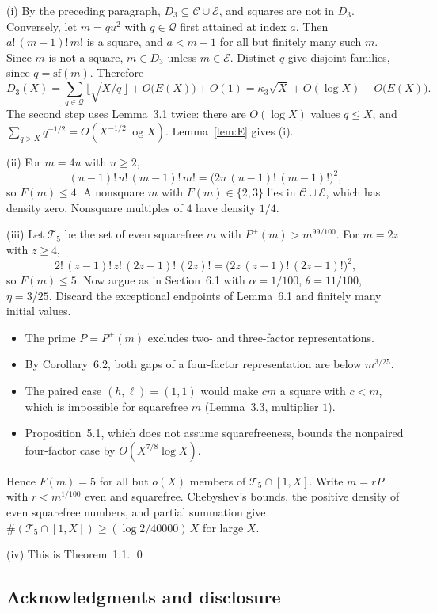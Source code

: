 \documentclass[letterpaper]{article}
\theoremstyle{definition}
\theoremstyle{remark}
\numberwithin{equation}{section}
\begin{document}
(i) By the preceding paragraph, $D_3\subseteq\mathcal C\cup\mathcal E$, and squares are not in $D_3$.
Conversely, let $m=qu^2$ with $q\in\mathcal Q$ first attained at index $a$. Then $a!\,(m-1)!\,m!$ is a
square, and $a<m-1$ for all but finitely many such $m$. Since $m$ is not a square, $m\in D_3$ unless
$m\in\mathcal E$. Distinct $q$ give disjoint families, since $q=\mathrm{sf}(m)$. Therefore
\[
  D_3(X)=\sum_{q\in\mathcal Q}\bigl\lfloor\sqrt{X/q}\,\bigr\rfloor+O\bigl(E(X)\bigr)+O(1)
  =\kappa_3\sqrt X+O(\log X)+O\bigl(E(X)\bigr).
\]
The second step uses Lemma~3.1 twice: there are $O(\log X)$ values $q\le X$, and
$\sum_{q>X}q^{-1/2}=O(X^{-1/2}\log X)$. Lemma~\ref{lem:E} gives (i).

(ii) For $m=4u$ with $u\ge 2$,
\[ (u-1)!\,u!\,(m-1)!\,m!=\bigl(2u\,(u-1)!\,(m-1)!\bigr)^2, \]
so $F(m)\le 4$. A nonsquare $m$ with $F(m)\in\{2,3\}$ lies in $\mathcal C\cup\mathcal E$, which has
density zero. Nonsquare multiples of $4$ have density $1/4$.

(iii) Let $\mathcal T_5$ be the set of even squarefree $m$ with $P^+(m)>m^{99/100}$. For $m=2z$ with
$z\ge 4$,
\[ 2!\,(z-1)!\,z!\,(2z-1)!\,(2z)!=\bigl(2z\,(z-1)!\,(2z-1)!\bigr)^2, \]
so $F(m)\le 5$. Now argue as in Section~6.1 with $\alpha=1/100$, $\theta=11/100$, $\eta=3/25$.
Discard the exceptional endpoints of Lemma~6.1 and finitely many initial values.
\begin{itemize}
\item The prime $P=P^+(m)$ excludes two- and three-factor representations.
\item By Corollary~6.2, both gaps of a four-factor representation are below $m^{3/25}$.
\item The paired case $(h,\ell)=(1,1)$ would make $cm$ a square with $c<m$, which is impossible for
  squarefree $m$ (Lemma~3.3, multiplier $1$).
\item Proposition~5.1, which does not assume squarefreeness, bounds the nonpaired four-factor case
  by $O(X^{7/8}\log X)$.
\end{itemize}
Hence $F(m)=5$ for all but $o(X)$ members of $\mathcal T_5\cap[1,X]$. Write $m=rP$ with $r<m^{1/100}$
even and squarefree. Chebyshev's bounds, the positive density of even squarefree numbers, and partial
summation give $\#(\mathcal T_5\cap[1,X])\ge(\log 2/40000)\,X$ for large $X$.

(iv) This is Theorem~1.1. \qed

\subsection*{Acknowledgments and disclosure}
\end{document}
